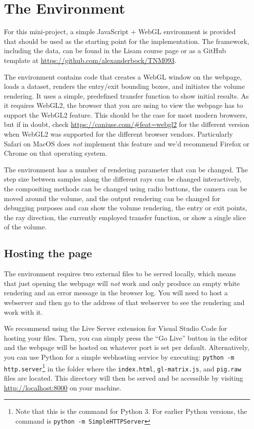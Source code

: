 \documentclass{labinstructions}
\begin{document}
\section{The Environment}
For this mini-project, a simple JavaScript + WebGL environment is provided that should be used as the starting point for the implementation.  The framework, including the data, can be found in the Lisam course page or as a GitHub template at \href{https://github.com/alexanderbock/TNM093}{https://github.com/alexanderbock/TNM093}.

The environment contains code that creates a WebGL window on the webpage, loads a dataset, renders the entry/exit bounding boxes, and initiates the volume rendering.  It uses a simple, predefined transfer function to show initial results.  As it requires WebGL2, the browser that you are using to view the webpage has to support the WebGL2 feature.  This should be the case for most modern browsers, but if in doubt, check \href{https://caniuse.com/\#feat=webgl2}{https://caniuse.com/\#feat=webgl2} for the different version when WebGL2 was supported for the different browser vendors.  Particularly Safari on MacOS does \emph{not} implement this feature and we'd recommend Firefox or Chrome on that operating system.

The environment has a number of rendering parameter that can be changed.  The step size between samples along the different rays can be changed interactively, the compositing methods can be changed using radio buttons, the camera can be moved around the volume, and the output rendering can be changed for debugging purposes and can show the volume rendering, the entry or exit points, the ray direction, the currently employed transfer function, or show a single slice of the volume.

\subsection{Hosting the page}
The environment requires two external files to be served locally, which means that just opening the webpage will \emph{not} work and only produce an empty white rendering and an error message in the browser log.  You will need to host a webserver and then go to the address of that webserver to see the rendering and work with it.

We recommend using the Live Server extension for Visual Studio Code for hosting your files. Then, you can simply press the  ``Go Live'' button in the editor and the webpage will be hosted on whatever port is set per default.
Alternatively, you can use Python for a simple webhosting service by executing: \texttt{python -m http.server}\footnote{Note that this is the command for Python 3. For earlier Python versions, the command is \texttt{python -m SimpleHTTPServer}} in the folder where the \texttt{index.html}, \texttt{gl-matrix.js}, and \texttt{pig.raw} files are located.  This directory will then be served and be accessible by visiting \href{http://localhost:8000}{http://localhost:8000} on your machine.
\end{document}

